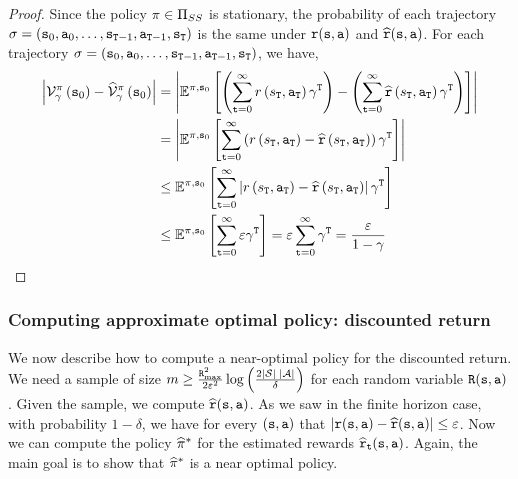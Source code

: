 \begin{proof}
Since the policy $\pi\in {\Pi _{SS}}$ is stationary, the
probability of each trajectory $\sigma=({\tt s}_0,{\tt a}_0,\ldots,
{\tt s}_{{\tt T}-1},{\tt a}_{{\tt T}-1},{\tt s}_{\tt T})$ is the
same under ${\tt r}({\tt s},{\tt a})$ and
$\widehat{{\tt r}}({\tt s},{\tt a})$. For each trajectory
$\sigma=({\tt s}_0,{\tt a}_0,\ldots,
{\tt s}_{{\tt T}-1},{\tt a}_{{\tt T}-1},{\tt s}_{\tt T})$, we
have,
\begin{align*}
	\left|\mathcal{V}_{\gamma}^{\pi}\left({\tt s}_{0}\right)-\widehat{\mathcal{V}}_{\gamma}^{\pi}\left({\tt s}_{0}\right)\right| & =\left|\mathbb{E}^{\pi,{\tt s}_{0}}\left[\left(\sum_{{\tt t}=0}^{\infty}r\left(s_{\tt T},{\tt a}_{\tt T}\right)\gamma^{\tt T}\right)-\left(\sum_{{\tt t}=0}^{\infty}\widehat{{\tt r}}\left(s_{\tt T},{\tt a}_{\tt T}\right)\gamma^{\tt T}\right)\right]\right|\\
	& =\left|\mathbb{E}^{\pi,{\tt s}_{0}}\left[\sum_{{\tt t}=0}^{\infty}\left(r\left(s_{\tt T},{\tt a}_{\tt T}\right)-\widehat{{\tt r}}\left(s_{\tt T},{\tt a}_{\tt T}\right)\right)\gamma^{\tt T}\right]\right|\\
	& \leq\mathbb{E}^{\pi,{\tt s}_{0}}\left[\sum_{{\tt t}=0}^{\infty}\left|r\left(s_{\tt T},{\tt a}_{\tt T}\right)-\widehat{{\tt r}}\left(s_{\tt T},{\tt a}_{\tt T}\right)\right|\gamma^{\tt T}\right]\\
	& \leq\mathbb{E}^{\pi,{\tt s}_{0}}\left[\sum_{{\tt t}=0}^{\infty}\varepsilon\gamma^{\tt T}\right]=\varepsilon\sum_{{\tt t}=0}^{\infty}\gamma^{\tt T}=\frac{\varepsilon}{1-\gamma}
\end{align*}
\end{proof}

\subsubsection{Computing approximate optimal policy: discounted return}

We now describe how to compute a near-optimal policy for the
discounted return.
We need a sample of size $m\geq \frac{{\tt R}_{\max }^2}{2\varepsilon^2}\log\left(
\frac{2|\mathcal{S}|\;|\mathcal{A}|}{\delta}\right)$ for each random variable
${\tt R}({\tt s},{\tt a})$. Given the sample, we compute
$\widehat{{\tt r}}({\tt s},{\tt a})$. As we saw in the finite horizon
case, with probability $1-\delta$, we have for every
$({\tt s},{\tt a})$ that
$|{\tt r}({\tt s},{\tt a})-\widehat{{\tt r}}({\tt s},{\tt a})|\leq
\varepsilon$. Now we can compute the policy $\widehat{\pi}^*$
for the estimated rewards
$\widehat{{\tt r}}_{\tt t}({\tt s},{\tt a})$. Again, the main goal is
to show that $\widehat{\pi}^*$ is a near optimal policy.

